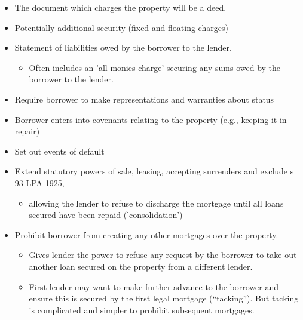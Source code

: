 \documentclass[
]{article}
\providecommand{\tightlist}{%
  \setlength{\itemsep}{0pt}\setlength{\parskip}{0pt}}
\begin{document}
\begin{itemize}
\tightlist
\item
  The document which charges the property will be a deed.
\item
  Potentially additional security (fixed and floating charges)
\item
  Statement of liabilities owed by the borrower to the lender.

  \begin{itemize}
  \tightlist
  \item
    Often includes an 'all monies charge' securing any sums owed by the
    borrower to the lender.
  \end{itemize}
\item
  Require borrower to make representations and warranties about status
\item
  Borrower enters into covenants relating to the property (e.g., keeping
  it in repair)
\item
  Set out events of default
\item
  Extend statutory powers of sale, leasing, accepting surrenders and
  exclude s 93 LPA 1925,

  \begin{itemize}
  \tightlist
  \item
    allowing the lender to refuse to discharge the mortgage until all
    loans secured have been repaid ('consolidation')
  \end{itemize}
\item
  Prohibit borrower from creating any other mortgages over the property.

  \begin{itemize}
  \tightlist
  \item
    Gives lender the power to refuse any request by the borrower to take
    out another loan secured on the property from a different lender.
  \item
    First lender may want to make further advance to the borrower and
    ensure this is secured by the first legal mortgage (``tacking'').
    But tacking is complicated and simpler to prohibit subsequent
    mortgages.
  \end{itemize}
\end{itemize}
\end{document}
